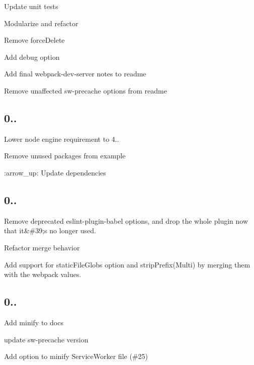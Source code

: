 \begin{DoxyItemize}
\item Update unit tests
\item Modularize and refactor
\item Remove force\+Delete
\item Add debug option
\item Add final webpack-\/dev-\/server notes to readme
\item Remove unaffected sw-\/precache options from readme
\end{DoxyItemize}

\subsection*{0..}


\begin{DoxyItemize}
\item Lower node engine requirement to 4..
\item Remove unused packages from example
\item \+:arrow\+\_\+up\+: Update dependencies
\end{DoxyItemize}

\subsection*{0..}


\begin{DoxyItemize}
\item Remove deprecated eslint-\/plugin-\/babel options, and drop the whole plugin now that it\&\#39;s no longer used.
\item Refactor merge behavior
\item Add support for static\+File\+Globs option and strip\+Prefix(\+Multi) by merging them with the webpack values.
\end{DoxyItemize}

\subsection*{0..}


\begin{DoxyItemize}
\item Add minify to docs
\item update sw-\/precache version
\item Add option to minify Service\+Worker file (\#25)
\end{DoxyItemize}


